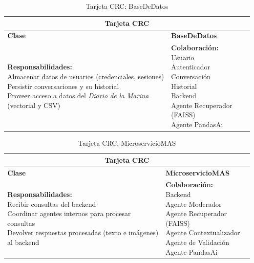 \begin{addendum}
		\begin{longtable}{|l|l|}
			\caption{Tarjeta CRC: BaseDeDatos} \label{tablacrc12} \\
			\hline
			\multicolumn{2}{|c|}{\textbf{Tarjeta CRC}} \\
			\hline
			\textbf{Clase} & \textbf{BaseDeDatos} \\
			\hline
			\parbox[t]{0.45\linewidth}{\textbf{Responsabilidades:} \\ 
				Almacenar datos de usuarios (credenciales, sesiones) \\ 
				Persistir conversaciones y su historial \\ 
				Proveer acceso a datos del \textit{Diario de la Marina} (vectorial y CSV)} 
			& 
			\parbox[t]{0.45\linewidth}{\textbf{Colaboración:} \\ 
				Usuario \\ 
				Autenticador \\ 
				Conversación \\ 
				Historial \\ 
				Backend \\ 
				Agente Recuperador (FAISS) \\ 
				Agente PandasAi} \\
			\hline
		\end{longtable}
		
		\begin{longtable}{|l|l|}
			\caption{Tarjeta CRC: MicroservicioMAS} \label{tablacrc13} \\
			\hline
			\multicolumn{2}{|c|}{\textbf{Tarjeta CRC}} \\
			\hline
			\textbf{Clase} & \textbf{MicroservicioMAS} \\
			\hline
			\parbox[t]{0.45\linewidth}{\textbf{Responsabilidades:} \\ 
				Recibir consultas del backend \\ 
				Coordinar agentes internos para procesar consultas \\ 
				Devolver respuestas procesadas (texto e imágenes) al backend} 
			& 
			\parbox[t]{0.45\linewidth}{\textbf{Colaboración:} \\ 
				Backend \\ 
				Agente Moderador \\ 
				Agente Recuperador (FAISS) \\ 
				Agente Contextualizador \\ 
				Agente de Validación \\ 
				Agente PandasAi} \\
			\hline
		\end{longtable}
		
		
		
		
\end{addendum}
